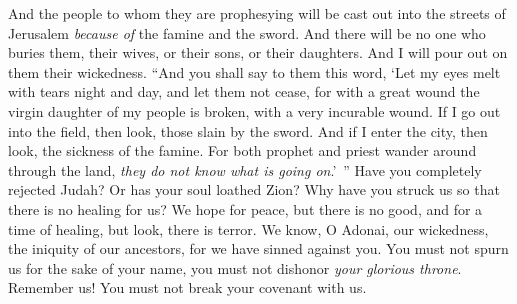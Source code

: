 \begin{biblechapter}
\verse And the people to whom they are prophesying will be cast out into the streets of Jerusalem \textit{because of} the famine and the sword. And there will be no one who buries them, their wives, or their sons, or their daughters. And I will pour out on them their wickedness.
 “And you shall say to them this word,
\verse ‘Let my eyes melt with tears night and day, 
and let them not cease, 
for with a great wound the virgin daughter of my people is broken, 
with a very incurable wound.
\verse If I go out into the field, 
then look, those slain by the sword. 
And if I enter the city, 
then look, the sickness of the famine. 
For both prophet and priest wander around through the land, 
\textit{they do not know what is going on}.’ ”
\verse Have you completely rejected Judah? 
Or has your soul loathed Zion? 
Why have you struck us 
so that there is no healing for us? 
We hope for peace, but there is no good, 
and for a time of healing, but look, there is terror.
\verse We know, O Adonai, our wickedness, 
the iniquity of our ancestors, 
for we have sinned against you.
\verse You must not spurn us for the sake of your name, 
you must not dishonor \textit{your glorious throne}. 
Remember us! 
You must not break your covenant with us.
\end{biblechapter}

